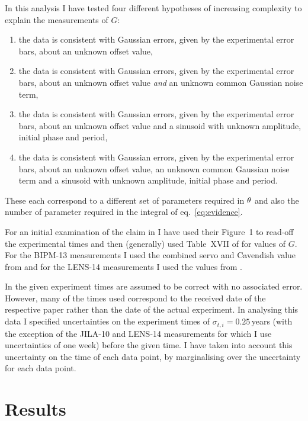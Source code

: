 \documentclass[doublecol]{epl2}
\begin{document}
In this analysis I have tested four different hypotheses of increasing complexity to explain the measurements of $G$:
\begin{enumerate}
 \item the data is consistent with Gaussian errors, given by the experimental error bars, about an unknown
 offset value,
 \item the data is consistent with Gaussian errors, given by the experimental error bars, about an unknown
 offset value {\it and} an unknown common Gaussian noise term,
 \item the data is consistent with Gaussian errors, given by the experimental error bars, about an unknown
 offset value and a sinusoid with unknown amplitude, initial phase and period,
 \item the data is consistent with Gaussian errors, given by the experimental error bars, about an unknown
 offset value, an unknown common Gaussian noise term and a sinusoid with unknown amplitude, initial phase and period.
\end{enumerate}
These each correspond to a different set of parameters required in $\mathbf{\theta}$ and also the number of
parameter required in the integral of eq.~\ref{eq:evidence}.

For an initial examination of the claim in \cite{2015EL....11010002A} I have used their Figure~1 to read-off
the experimental times and then (generally) used Table~XVII of \cite{RevModPhys.84.1527} for values of $G$.
For the BIPM-13 measurements I used the combined servo and Cavendish value from \cite{PhysRevLett.113.039901}
and for the LENS-14 measurements I used the values from \cite{2014Natur.510..518R}.

In \cite{2015EL....11010002A} the given experiment times are assumed to be correct with no associated error.
However, many of the times used correspond to the received date of the respective paper rather than the
date of the actual experiment.  In analysing this data I specified uncertainties on the experiment times of
$\sigma_{t,i} = 0.25$\,years (with the exception of the JILA-10 and LENS-14 measurements for which I use uncertainties
of one week) before the given time. I have taken into account this uncertainty on the
time of each data point, by marginalising over the uncertainty for each data point.

\section{Results}
\end{document}
